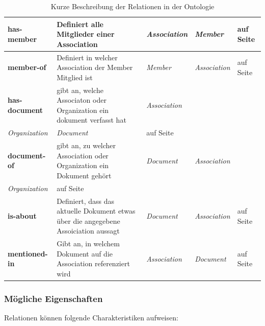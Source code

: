 ﻿\documentclass[
    11pt,
    latin1,
    a4paper,
    oneside
]{scrreprt}
\begin{document}
\begin{table}[h]
\begin{tabular}{ | l | p{5cm} | l | l| l | }
		\textbf{has-member} & Definiert alle Mitglieder einer Association & \emph{Association} & \emph{Member} & \nameref{sec:rel_hasmember} auf Seite \pageref{sec:rel_hasmember} \\ \hline
		\textbf{member-of} & Definiert in welcher Association der Member Mitglied ist & \emph{Member} & \emph{Association} & \nameref{sec:rel_memberof} auf Seite \pageref{sec:rel_memberof} \\ \hline
		
		\textbf{has-document} & gibt an, welche Associaton oder Organization ein dokument verfasst hat & \emph{Association} \\ \emph{Organization} & \emph{Document} & \nameref{sec:rel_hasdocument} auf Seite \pageref{sec:rel_hasdocument} \\ \hline
		\textbf{document-of} & gibt an, zu welcher Association oder Organization ein Dokument geh\"ort & \emph{Document} & \emph{Association} \\ \emph{Organization} & \nameref{sec:rel_documentof} auf Seite \pageref{sec:rel_documentof} \\ \hline
		
		\textbf{is-about} & Definiert, dass das aktuelle Dokument etwas \"uber die angegebene Assoiciation aussagt & \emph{Document} & \emph{Association} & \nameref{sec:rel_isabout} auf Seite \pageref{sec:rel_isabout} \\ \hline
		\textbf{mentioned-in} & Gibt an, in welchem Dokument auf die Association referenziert wird & \emph{Association} & \emph{Document} & \nameref{sec:rel_mentionedin} auf Seite \pageref{sec:rel_mentionedin} \\ \hline
		
	\end{tabular}
	\caption{Kurze Beschreibung der Relationen in der Ontologie}
	\label{tbl:classes}
\end{table}

\subsubsection{M\"ogliche Eigenschaften} \label{sec:relations_settings}

Relationen k\"onnen folgende Charakteristiken aufweisen:
\end{document}
